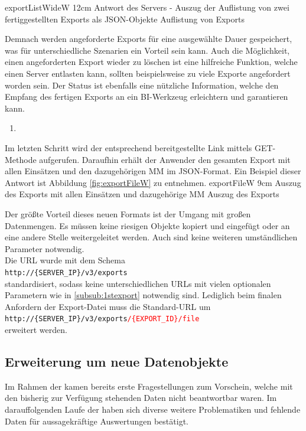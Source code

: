 \bild
{exportListWideW}
{12cm}
{Antwort des Servers - Auszug der Auflistung von zwei fertiggestellten Exports als JSON-Objekte}
{Auflistung von Exports}

Demnach werden angeforderte Exports für eine ausgewählte Dauer gespeichert, was für unterschiedliche Szenarien ein Vorteil sein kann.
Auch die Möglichkeit, einen angeforderten Export wieder zu löschen ist eine hilfreiche Funktion, welche einen Server entlasten kann, sollten beispielsweise zu viele Exporte angefordert worden sein.
Der Status ist ebenfalls eine nützliche Information, welche den Empfang des fertigen Exports an ein \gls{BI}-Werkzeug erleichtern und garantieren kann.

\begin{enumerate}[resume]
\item {}
\end{enumerate}

Im letzten Schritt wird der entsprechend bereitgestellte Link mittels GET-Methode aufgerufen.
Daraufhin erhält der Anwender den gesamten Export mit allen Einsätzen und den dazugehörigen \gls{MM} im JSON-Format. 
Ein Beispiel dieser Antwort ist Abbildung \ref{fig:exportFileW} zu entnehmen.
\bild
{exportFileW}
{9cm}
{Auszug des Exports mit allen Einsätzen und dazugehörige \gls{MM}}
{Auszug des Exports}

Der größte Vorteil dieses neuen Formats ist der Umgang mit großen Datenmengen.
Es müssen keine riesigen Objekte kopiert und eingefügt oder an eine andere Stelle weitergeleitet werden. 
Auch sind keine weiteren umständlichen Parameter notwendig. \\
Die URL wurde mit dem Schema \\
\colorbox[RGB]{240,240,240}{\texttt{http://\{SERVER\_IP\}/v3/exports}} \\
standardisiert, sodass keine unterschiedlichen URLs mit vielen optionalen Parametern wie in \ref{subsub:1stexport} notwendig sind.
Lediglich beim finalen Anfordern der Export-Datei muss die Standard-URL um \\
\colorbox[RGB]{240,240,240}{\texttt{http://\{SERVER\_IP\}/v3/exports\textcolor{red}{/\{EXPORT\_ID\}/file}}} \\
erweitert werden. 

\subsection{Erweiterung um neue Datenobjekte} %
\label{sub:erweiterung}
Im Rahmen der  kamen bereits erste Fragestellungen zum Vorschein, welche mit den bisherig zur Verfügung stehenden Daten nicht beantwortbar waren.
Im darauffolgenden Laufe der  haben sich diverse weitere Problematiken und fehlende Daten für aussagekräftige Auswertungen bestätigt.

